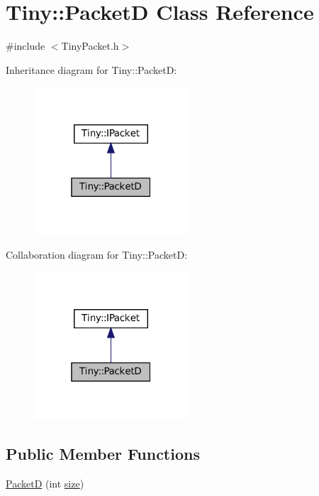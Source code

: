 \hypertarget{classTiny_1_1PacketD}{}\section{Tiny\+:\+:PacketD Class Reference}
\label{classTiny_1_1PacketD}


{\ttfamily \#include $<$Tiny\+Packet.\+h$>$}



Inheritance diagram for Tiny\+:\+:PacketD\+:\nopagebreak
\begin{figure}[H]
\begin{center}
\leavevmode
\includegraphics[width=163pt]{classTiny_1_1PacketD__inherit__graph}
\end{center}
\end{figure}


Collaboration diagram for Tiny\+:\+:PacketD\+:\nopagebreak
\begin{figure}[H]
\begin{center}
\leavevmode
\includegraphics[width=163pt]{classTiny_1_1PacketD__coll__graph}
\end{center}
\end{figure}
\subsection*{Public Member Functions}
\begin{DoxyCompactItemize}
\item 
\hyperlink{classTiny_1_1PacketD_a337a74c5e513be616aff0c1a0746612a}{PacketD} (int \hyperlink{classTiny_1_1IPacket_a76b6389f0d47b67c8428c58c2b09df51}{size})
\end{DoxyCompactItemize}


